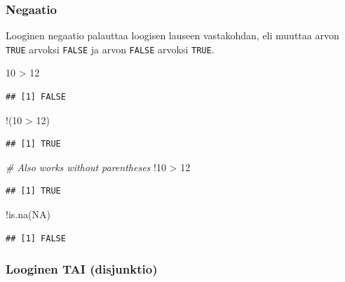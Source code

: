 \documentclass[
]{book}
\newenvironment{Shaded}{\begin{snugshade}}{\end{snugshade}}
\newcommand{\CommentTok}[1]{\textcolor[rgb]{0.56,0.35,0.01}{\textit{#1}}}
\newcommand{\ConstantTok}[1]{\textcolor[rgb]{0.00,0.00,0.00}{#1}}
\newcommand{\DecValTok}[1]{\textcolor[rgb]{0.00,0.00,0.81}{#1}}
\newcommand{\FunctionTok}[1]{\textcolor[rgb]{0.00,0.00,0.00}{#1}}
\newcommand{\NormalTok}[1]{#1}
\newcommand{\SpecialCharTok}[1]{\textcolor[rgb]{0.00,0.00,0.00}{#1}}
\begin{document}
\hypertarget{negaatio}{%
\subsubsection{Negaatio}\label{negaatio}}

Looginen negaatio palauttaa loogisen lauseen vastakohdan, eli muuttaa arvon \texttt{TRUE} arvoksi \texttt{FALSE} ja arvon \texttt{FALSE} arvoksi \texttt{TRUE}.

\begin{Shaded}
\begin{Highlighting}[]
\DecValTok{10} \SpecialCharTok{\textgreater{}} \DecValTok{12}
\end{Highlighting}
\end{Shaded}

\begin{verbatim}
## [1] FALSE
\end{verbatim}

\begin{Shaded}
\begin{Highlighting}[]
\SpecialCharTok{!}\NormalTok{(}\DecValTok{10} \SpecialCharTok{\textgreater{}} \DecValTok{12}\NormalTok{)}
\end{Highlighting}
\end{Shaded}

\begin{verbatim}
## [1] TRUE
\end{verbatim}

\begin{Shaded}
\begin{Highlighting}[]
\CommentTok{\# Also works without parentheses}
\SpecialCharTok{!}\DecValTok{10} \SpecialCharTok{\textgreater{}} \DecValTok{12}
\end{Highlighting}
\end{Shaded}

\begin{verbatim}
## [1] TRUE
\end{verbatim}

\begin{Shaded}
\begin{Highlighting}[]
\SpecialCharTok{!}\FunctionTok{is.na}\NormalTok{(}\ConstantTok{NA}\NormalTok{)}
\end{Highlighting}
\end{Shaded}

\begin{verbatim}
## [1] FALSE
\end{verbatim}

\hypertarget{looginen-tai-disjunktio}{%
\subsubsection{Looginen TAI (disjunktio)}\label{looginen-tai-disjunktio}}
\end{document}
